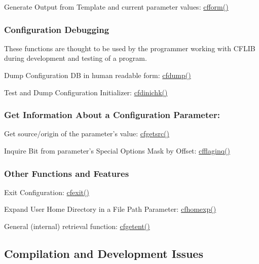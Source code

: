 \begin{DoxyItemize}
\item Generate Output from Template and current parameter values\-: \hyperlink{group__report__generation_ga2695585ee0a7485da6075848fa27a33f}{cfform()}
\end{DoxyItemize}\hypertarget{index_debugging}{}\subsubsection{Configuration Debugging}\label{index_debugging}
These functions are thought to be used by the programmer working with C\-F\-L\-I\-B during development and testing of a program.


\begin{DoxyItemize}
\item Dump Configuration D\-B in human readable form\-: \hyperlink{group__advanced__features_gaecfc8ee37366e1b36cb5aac0cc41ebdc}{cfdump()}
\begin{DoxyItemize}
\item Test and Dump Configuration Initializer\-: \hyperlink{group__advanced__features_ga35e2c28f591ac71e3617c612233ecdd0}{cfdinichk()}
\end{DoxyItemize}
\end{DoxyItemize}\hypertarget{index_metainfos}{}\subsubsection{Get Information About a Configuration Parameter\-:}\label{index_metainfos}

\begin{DoxyItemize}
\item Get source/origin of the parameter's value\-: \hyperlink{group__retrieval_gadf84eed41bdaa0a6cd8cd474c79d50b1}{cfgetsrc()}
\item Inquire Bit from parameter's Special Options Mask by Offset\-: \hyperlink{group__retrieval_ga09929d4a48932749dd9d0d32d0f3f08c}{cfflaginq()}
\end{DoxyItemize}\hypertarget{index_advanced_other}{}\subsubsection{Other Functions and Features}\label{index_advanced_other}

\begin{DoxyItemize}
\item Exit Configuration\-: \hyperlink{group__cflib__core_ga47bfff42f432b3e8b5b9f12b695e60db}{cfexit()}
\item Expand User Home Directory in a File Path Parameter\-: \hyperlink{group__advanced__features_ga469258ed449ac26d5c82e665db491ff2}{cfhomexp()}
\item General (internal) retrieval function\-: \hyperlink{group__retrieval_gac13ba743ed26e6c05df14817ad9df3da}{cfgetent()}
\end{DoxyItemize}\hypertarget{index_compilation_issues}{}\subsection{Compilation and Development Issues}\label{index_compilation_issues}

